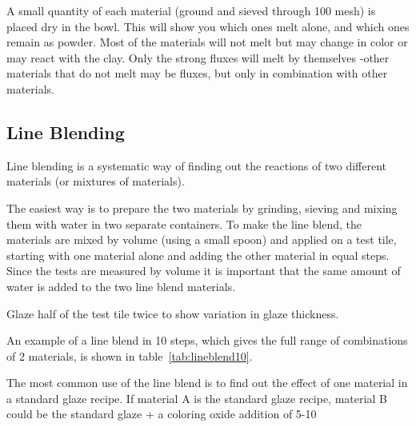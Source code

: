 A small quantity of each material (ground and sieved through 100 mesh) is 
placed dry in the bowl. This will show you which ones melt alone, and which 
ones remain as powder. Most of the materials will not melt but may change in 
color or may react with the clay. Only the strong fluxes will melt by 
themselves -other materials that do not melt may be fluxes, but only in 
combination with other materials.
\subsection{Line Blending}
Line blending is a systematic way of finding out the reactions of two different 
materials (or mixtures of materials).

The easiest way is to prepare the two materials by grinding, sieving and mixing 
them with water in two separate containers. To make the line blend, the 
materials are mixed by volume (using a small spoon) and applied on a test tile, 
starting with one material alone and adding the other material in equal steps. 
Since the tests are measured by volume it is important that the same amount of 
water is added to the two line blend materials.

Glaze half of the test tile twice to show variation in glaze thickness.

An example of a line blend in 10 steps, which gives the full range of 
combinations of 2 materials, is shown in table~\ref{tab:lineblend10}.

The most common use of the line blend is to find out the effect of one material 
in a standard glaze recipe. If material A is the standard glaze recipe, 
material B could be the standard glaze + a coloring oxide addition of 5-10%

